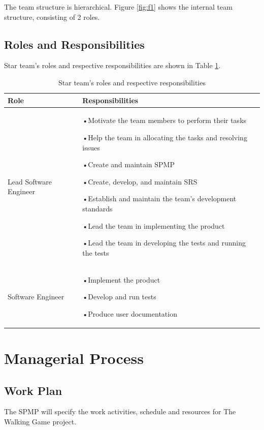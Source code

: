 \documentclass[12pt,letterpaper]{article}
\begin{document}
	The team structure is hierarchical. Figure \ref{fig:f1} shows the internal team structure, consisting of 2 roles.
	
	\clearpage
	\bigskip
	
	\subsection{Roles and Responsibilities}
	Star team's roles and respective responsibilities are shown in Table \ref{tab:t2}.
	
	\begin{table}[h]
		\begin{flushleft}
			\begin{tabular}{|p{1.73in}|p{4.3in}|}
				\hline
				Role &
				Responsibilities\\\hline
				Lead Software Engineer &
				•\enspace Motivate the team members to perform their tasks
				
				•\enspace Help the team in allocating the tasks and resolving issues
				
				•\enspace Create and maintain SPMP
				
				•\enspace Create, develop, and maintain SRS
				
				•\enspace Establish and maintain the team's development standards
				
				•\enspace Lead the team in implementing the product
				
				•\enspace Lead the team in developing the tests and running the tests
				
				\\\hline
				Software Engineer &
				•\enspace Implement the product
				
				•\enspace Develop and run tests
				
				•\enspace Produce user documentation
				
				\\\hline
			\end{tabular}
		\end{flushleft}
		\caption{Star team's roles and respective responsibilities}
		\label{tab:t2}
	\end{table}
	
	\clearpage
	\bigskip
	
	\section{Managerial Process}
	\subsection{Work Plan}
	The SPMP will specify the work activities, schedule and resources for The Walking Game project.
	
\end{document}
